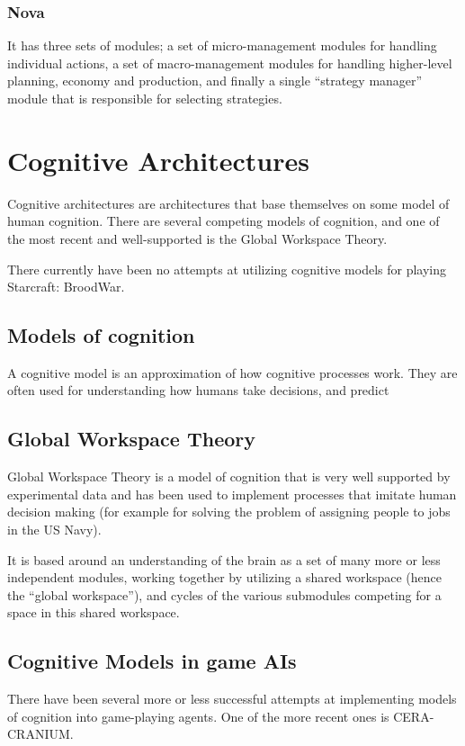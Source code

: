 \subsubsection{Nova}
It has three sets of modules; a set of micro-management modules for handling
individual actions, a set of macro-management modules for handling higher-level
planning, economy and production, and finally a single ``strategy manager''
module that is responsible for selecting strategies.

\section{Cognitive Architectures}
Cognitive architectures are architectures that base themselves on some model of
human cognition. There are several competing models of cognition, and one of
the most recent and well-supported is the Global Workspace Theory.

There currently have been no attempts at utilizing cognitive models for playing
Starcraft: BroodWar.

\subsection{Models of cognition}
A cognitive model is an approximation of how cognitive processes work. They are
often used for understanding how humans take decisions, and predict 

\subsection{Global Workspace Theory}

Global Workspace Theory is a model of cognition that is very well supported
by experimental data and has been used to implement processes that imitate
human decision making (for example for solving the problem of assigning
people to jobs in the US Navy). 

It is based around an understanding of the brain as a set of many more or less
independent modules, working together by utilizing a shared workspace (hence the
``global workspace''), and cycles of the various submodules competing for a
space in this shared workspace.\cite{baars2005gwd}

\subsection{Cognitive Models in game AIs}
There have been several more or less successful attempts at implementing models
of cognition into game-playing agents. One of the more recent ones is
CERA-CRANIUM.


